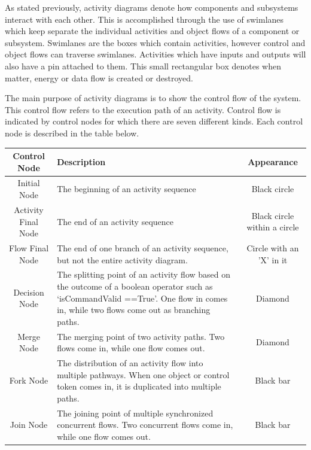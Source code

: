 As stated previously, activity diagrams denote how components and
subsystems interact with each other. This is accomplished through the
use of swimlanes which keep separate the individual activities and
object flows of a component or subsystem. Swimlanes are the boxes
which contain activities, however control and object flows can
traverse swimlanes. Activities which have inputs and outputs will also
have a pin attached to them. This small rectangular box denotes when
matter, energy or data flow is created or destroyed.  

The main purpose of activity diagrams is to show the control flow of
the system. This control flow refers to the execution path of an
activity. Control flow is indicated by control nodes for which there
are seven different kinds. Each control node is described in the table below.
\begin{table}[H]
  \begin{center}
    \begin{tabular}{c|p{7cm}|c}
      \hline
      Control Node & Description & Appearance \\
      \hline
      \hline
      Initial Node & The beginning of an activity sequence & Black
      circle \\
      \hline
      Activity Final Node & The end of an activity sequence & Black
      circle within a circle \\
      \hline
      Flow Final Node & The end of one branch of an activity sequence,
      but not the entire activity diagram. & Circle with an 'X' in it
      \\
      \hline
      Decision Node & The splitting point of an activity flow based on
      the outcome of a boolean operator such as ‘isCommandValid
      ==True’. One flow in comes in, while two flows come out as
      branching paths. & Diamond \\
      \hline
      Merge Node & The merging point of two activity paths. Two flows
      come in, while one flow comes out. & Diamond \\
      \hline
      Fork Node & The distribution of an activity flow into multiple
      pathways. When one object or control token comes in, it is
      duplicated into multiple paths. & Black bar \\
      \hline
      Join Node & The joining point of multiple synchronized
      concurrent flows. Two concurrent flows come in, while one flow
      comes out. & Black bar \\
      \hline
      \hline
    \end{tabular}
  \end{center}
\end{table}
